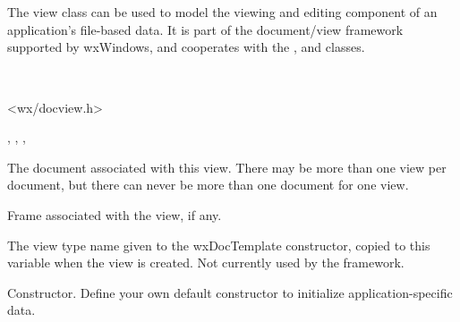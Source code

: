\section{}\label{wxview}

The view class can be used to model the viewing and editing component of
an application's file-based data. It is part of the document/view framework supported by wxWindows,
and cooperates with the ,  
and  classes.


\\


<wx/docview.h>


, , ,\rtfsp
{}




The document associated with this view. There may be more than one view per
document, but there can never be more than one document for one view.



Frame associated with the view, if any.



The view type name given to the wxDocTemplate constructor, copied to this
variable when the view is created. Not currently used by the framework.



Constructor. Define your own default constructor to initialize application-specific
data.



